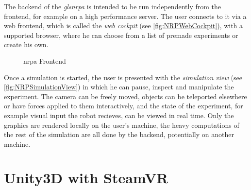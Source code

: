 The backend of the \textit{gls{nrpa}} is intended to be run independently from the frontend, for example on a high performance server. The user connects to it via a web frontend, which is called the \textit{web cockpit} (see \autoref{fig:NRPWebCockpit}), with a supported browser, where he can choose from a list of premade experiments or create his own.
\begin{figure} [h]
    \centering
    \hfill
    \caption{\gls{nrpa} Frontend}
    \label{fig:NRPFrontend}
\end{figure}
Once a simulation is started, the user is presented with the \textit{simulation view} (see \autoref{fig:NRPSimulationView}) in which he can pause, inspect and manipulate the experiment. The camera can be freely moved, objects can be teleported elsewhere or have forces applied to them interactively, and the state of the experiment, for example visual input the robot recieves, can be viewed in real time.
\newline
Only the graphics are rendered locally on the user's machine, the heavy computations of the rest of the simulation are all done by the backend, potentially on another machine.


\section{Unity3D with SteamVR}

